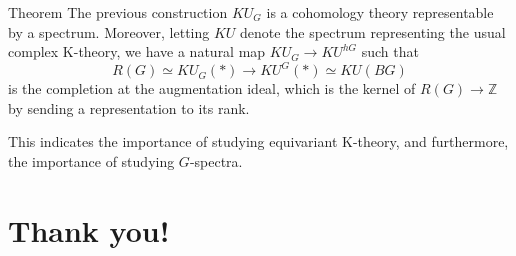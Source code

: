 \documentclass{beamer}
\begin{document}
\begin{frame}
	\begin{alertblock}{Theorem}
		The previous construction $KU_G$ is a cohomology theory representable by a spectrum. Moreover, letting $KU$ denote the spectrum representing the usual complex K-theory, we have a natural map $KU_G\to KU^{hG}$ such that 
		\[ R(G)\simeq KU_G(*)\to KU^G(*)\simeq KU(BG) \]
		is the completion at the augmentation ideal, which is the kernel of $R(G)\to\mathbb{Z}$ by sending a representation to its rank. 
	\end{alertblock}
	This indicates the importance of studying equivariant K-theory, and furthermore, the importance of studying $G$-spectra. 
\end{frame}

\section{Thank you!}

\begin{frame}
	\nocite{*}
	\printbibliography{}
\end{frame}
\end{document}
